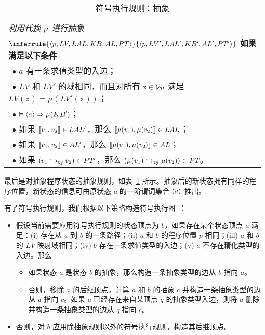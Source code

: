 \begin{table}[htbp]
\caption{符号执行规则：抽象}
\label{tab:rule-abstract}
\begin{tabularx}{\textwidth}{|X|}
\hline
\emph{利用代换 $\mu$ 进行抽象} \\
{\centering $
\inferrule
   {\lb p, LV, LAL, KB, AL, PT\rb}
   {\lb p, LV', LAL', KB', AL', PT'\rb }
$ \\}
\textbf{如果满足以下条件} \\
~$\bullet$ $a$ 有一条求值类型的入边； \\
~$\bullet$ $LV$ 和 $LV'$ 的域相同，而且对所有 $\texttt{x} \in\mathcal{V}_{\mathcal{P}}$ 满足 $LV(\texttt{x}) = \mu(LV'(\texttt{x}))$； \\
~$\bullet$ $\vDash \langle a\rangle \Rightarrow \mu(KB')$；\\
~$\bullet$ 如果 $\llbracket v_1,v_2 \rrbracket\in LAL'$，那么 $\llbracket \mu(v_1),\mu(v_2) \rrbracket\in LAL$； \\
~$\bullet$ 如果 $\llbracket v_1,v_2 \rrbracket\in AL'$，那么 $\llbracket \mu(v_1),\mu(v_2) \rrbracket\in AL$； \\
~$\bullet$ 如果 $(v_1\hookrightarrow_{\texttt{ty}} v_2)\in PT'$，那么 $(\mu(v_1)\hookrightarrow_{\texttt{ty}}\mu(v_2))\in PT$。 \\
\hline
\end{tabularx}
\end{table}

最后是对抽象程序状态的抽象规则，如表~\ref{tab:rule-abstract} 所示。抽象后的新状态拥有同样的程序位置，新状态的信息可由原状态 $a$ 的一阶谓词集合 $\langle a\rangle$ 推出。

有了符号执行规则，我们根据以下策略构造符号执行图~\cite{DBLP:journals/jar/StroderGBFFHSA17}：
\begin{itemize}
\item 
假设当前需要应用符号执行规则的状态顶点为 $b$，如果存在某个状态顶点 $a$ 满足：(i) 存在从 $a$ 到 $b$ 的一条路径；(ii) $a$ 和 $b$ 的程序位置 $p$ 相同；(iii) $a$ 和 $b$ 的 $LV$ 映射域相同；(iv) $b$ 存在一条求值类型的入边；(v) $a$ 不存在精化类型的入边。那么
\begin{itemize}
\item 如果状态 $a$ 是状态 $b$ 的抽象，那么构造一条抽象类型的边从 $b$ 指向 $a$。
\item 否则，移除 $a$ 的后继顶点，计算 $a$ 和 $b$ 的抽象 $c$ 并构造一条抽象类型的边从 $a$ 指向 $c$。如果 $a$ 已经存在来自某顶点 $q$ 的抽象类型入边，则将 $a$ 删除并构造一条抽象类型的边从 $q$ 指向 $c$。
\end{itemize}
\item
否则，对 $b$ 应用除抽象规则以外的符号执行规则，构造其后继顶点。
\end{itemize}

